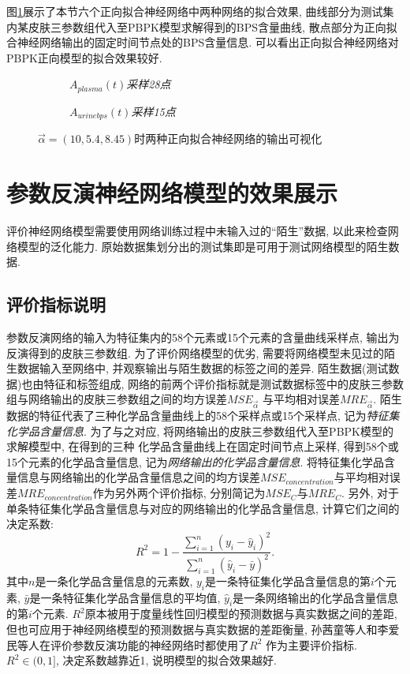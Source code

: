 \documentclass[a4paper,punct=banjiao,twoside]{ctexrep}
\theoremstyle{plain}
\theoremstyle{definition}
\theoremstyle{remark}
\begin{document}
图\ref{正向可视化1}展示了本节六个正向拟合神经网络中两种网络的拟合效果, 曲线部分为测试集内某皮肤三参数组代入至PBPK模型求解得到的BPS含量曲线, 散点部分为正向拟合神经网络输出的固定时间节点处的BPS含量信息. 可以看出正向拟合神经网络对PBPK正向模型的拟合效果较好.
\begin{figure}[H]
  \centering
  \begin{subfigure}{0.45\textwidth}
    \centering
    \resizebox{1\textwidth}{!}{}
    \caption{$A_{plasma}(t)$\textit{采样28点}}
  \end{subfigure}
  \begin{subfigure}{0.45\textwidth}
    \centering
    \resizebox{1\textwidth}{!}{}
    \caption{$A_{urinebps}(t)$\textit{采样15点}}
  \end{subfigure}
  \caption{$\vec{\alpha}=(10,5.4,8.45)$时两种正向拟合神经网络的输出可视化}
  \label{正向可视化1}
\end{figure}

\section{参数反演神经网络模型的效果展示}
\label{3.6}
评价神经网络模型需要使用网络训练过程中未输入过的``陌生''数据, 以此来检查网络模型的泛化能力. 原始数据集划分出的测试集即是可用于测试网络模型的陌生数据.
\subsection*{评价指标说明}

参数反演网络的输入为特征集内的58个元素或15个元素的含量曲线采样点, 输出为反演得到的皮肤三参数组. 
为了评价网络模型的优劣, 需要将网络模型未见过的陌生数据输入至网络中, 并观察输出与陌生数据的标签之间的差异.
陌生数据(测试数据)也由特征和标签组成, 网络的前两个评价指标就是测试数据标签中的皮肤三参数组与网络输出的皮肤三参数组之间的均方误差$MSE_{\vec{\alpha}}$
与平均相对误差$MRE_{\vec{\alpha}}$.
陌生数据的特征代表了三种化学品含量曲线上的58个采样点或15个采样点, 记为\textit{特征集化学品含量信息}. 为了与之对应, 将网络输出的皮肤三参数组代入至PBPK模型的求解模型中, 在得到的三种
化学品含量曲线上在固定时间节点上采样, 得到58个或15个元素的化学品含量信息, 记为\textit{网络输出的化学品含量信息}.
将特征集化学品含量信息与网络输出的化学品含量信息之间的均方误差$MSE_{concentration}$与平均相对误差$MRE_{concentration}$作为另外两个评价指标, 分别简记为$MSE_{C}$与$MRE_{C}$.
另外, 对于单条特征集化学品含量信息与对应的网络输出的化学品含量信息, 计算它们之间的决定系数\cite{26}:
$$
R^2 = 1 - \frac{\sum_{i=1}^{n} (y_i - \hat{y}_i)^2}{\sum_{i=1}^{n} (\hat{y}_i - \bar{y})^2 }.
$$
其中$n$是一条化学品含量信息的元素数, $y_i$是一条特征集化学品含量信息的第$i$个元素, $\bar{y}$是一条特征集化学品含量信息的平均值, $\hat{y}_i$是一条网络输出的化学品含量信息的第$i$个元素.
$R^2$原本被用于度量线性回归模型的预测数据与真实数据之间的差距\cite{26}, 但也可应用于神经网络模型的预测数据与真实数据的差距衡量, 孙茜童等人和李爱民等人\cite{27,28}在评价参数反演功能的神经网络时都使用了$R^2$
作为主要评价指标. $R^2 \in (0,1]$, 决定系数越靠近1, 说明模型的拟合效果越好.
\end{document}
